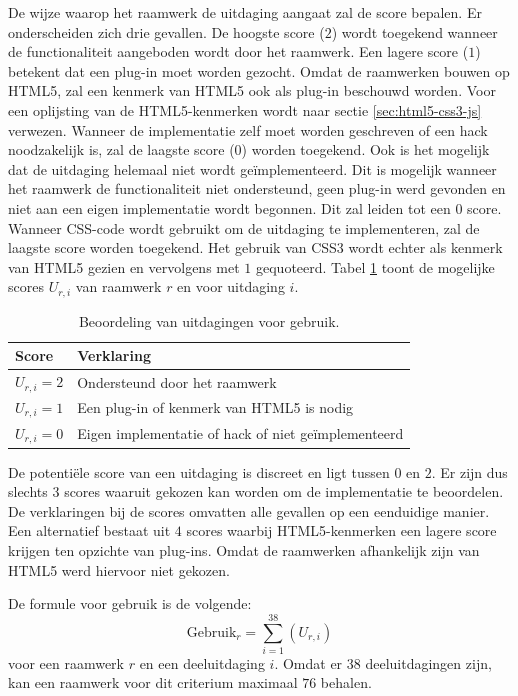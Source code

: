 De wijze waarop het raamwerk de uitdaging aangaat zal de score bepalen.
Er onderscheiden zich drie gevallen.
De hoogste score ($2$) wordt toegekend wanneer de functionaliteit aangeboden wordt door het raamwerk. 
Een lagere score ($1$) betekent dat een plug-in moet worden gezocht.
Omdat de raamwerken bouwen op HTML5, zal een kenmerk van HTML5 ook als plug-in beschouwd worden.
Voor een oplijsting van de HTML5-kenmerken wordt naar sectie \ref{sec:html5-css3-js} verwezen.
Wanneer de implementatie zelf moet worden geschreven of een hack noodzakelijk is, zal de laagste score ($0$) worden toegekend.
Ook is het mogelijk  dat de uitdaging helemaal niet wordt geïmplementeerd.
Dit is mogelijk wanneer het raamwerk de functionaliteit niet ondersteund,  geen plug-in werd gevonden en niet aan een eigen implementatie wordt begonnen.
Dit zal leiden tot een $0$ score.
Wanneer CSS-code wordt gebruikt om de uitdaging te implementeren, zal de laagste score worden toegekend.
Het gebruik van CSS3 wordt echter als kenmerk van HTML5 gezien en vervolgens met $1$ gequoteerd.
Tabel \ref{tabel:scores-uitdagingen} toont de mogelijke scores $U_{r,i}$ van raamwerk $r$ en voor uitdaging $i$.
\begin{table}[b]	
  \centering
  \begin{tabular}{ll}
    \toprule
    \textbf{Score} & \textbf{Verklaring}\\
    \midrule
    $U_{r,i} = 2$ & Ondersteund door het raamwerk\\
    $U_{r,i} = 1$ & Een plug-in of kenmerk van HTML5 is nodig\\
    $U_{r,i} = 0$ & Eigen implementatie of hack of niet geïmplementeerd\\ 
    \bottomrule
  \end{tabular}
  \caption{Beoordeling van uitdagingen voor gebruik.}
  \label{tabel:scores-uitdagingen}
\end{table}

De potentiële score van een uitdaging is discreet en ligt tussen $0$ en $2$.
Er zijn dus slechts $3$ scores waaruit gekozen kan worden om de implementatie te beoordelen.
De verklaringen bij de scores omvatten alle gevallen op een eenduidige manier.
Een alternatief bestaat uit $4$ scores waarbij HTML5-kenmerken een lagere score krijgen ten opzichte van plug-ins.
Omdat de raamwerken afhankelijk zijn van HTML5 werd hiervoor niet gekozen.

De formule voor gebruik is de volgende:
\begin{equation}
  \text{Gebruik}_r = \sum_{i=1}^{38}{\left(U_{r,i}\right)}
  \label{eq:gebruik}
\end{equation}
voor een raamwerk $r$ en een deeluitdaging $i$.
Omdat er $38$ deeluitdagingen zijn, kan een raamwerk voor dit criterium maximaal $76$ behalen.

